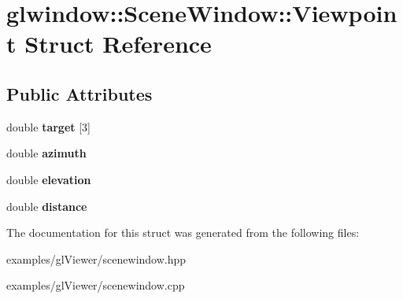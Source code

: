 \section{glwindow\+:\+:Scene\+Window\+:\+:Viewpoint Struct Reference}
\label{structglwindow_1_1_scene_window_1_1_viewpoint}
\subsection*{Public Attributes}
\begin{DoxyCompactItemize}
\item 
\mbox{\label{structglwindow_1_1_scene_window_1_1_viewpoint_a48d71514393c6538f2753b219ec25e1e}} 
double {\bfseries target} [3]
\item 
\mbox{\label{structglwindow_1_1_scene_window_1_1_viewpoint_a2c4761518908d5af7812a2427275b9da}} 
double {\bfseries azimuth}
\item 
\mbox{\label{structglwindow_1_1_scene_window_1_1_viewpoint_a019ecd110fdfc130d30318e728198718}} 
double {\bfseries elevation}
\item 
\mbox{\label{structglwindow_1_1_scene_window_1_1_viewpoint_ab9bf343d65bfd4a4ef814c812ab92136}} 
double {\bfseries distance}
\end{DoxyCompactItemize}


The documentation for this struct was generated from the following files\+:\begin{DoxyCompactItemize}
\item 
examples/gl\+Viewer/scenewindow.\+hpp\item 
examples/gl\+Viewer/scenewindow.\+cpp\end{DoxyCompactItemize}

